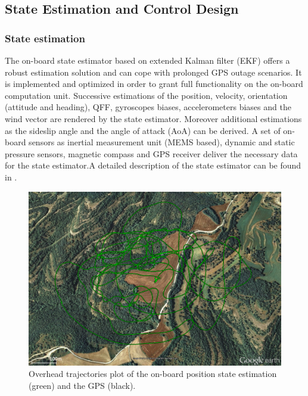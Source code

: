 \subsection{State Estimation and Control Design}
\subsubsection{State estimation}
The on-board state estimator based on extended Kalman filter (EKF) offers a robust estimation solution and can cope with prolonged GPS outage scenarios. It is implemented and optimized in order to grant full functionality on the on-board computation unit. 
Successive estimations of the position, velocity, orientation (attitude and heading), QFF, gyroscopes biases, accelerometers biases and the wind vector are rendered by the state estimator. Moreover additional estimations as the sideslip angle and the angle of attack (AoA) can be derived. A set of on-board sensors as inertial measurement unit (MEMS based), dynamic and static pressure sensors, magnetic compass and GPS receiver deliver the necessary data for the state estimator.A detailed description of the state estimator can be found in  \cite{Leutenegger_MSC2014}.

\begin{figure}[tb]
    \centering
    \includegraphics[width=\linewidth]{images/10_real_time_state_estimator_position}
    \caption{Overhead trajectories plot of the on-board position state estimation (green) and the GPS  (black).}
    \label{fig:real_time_state_estimator_positionl}
\end{figure}


